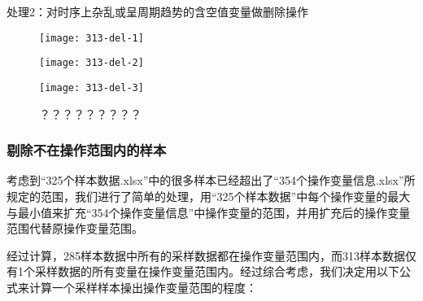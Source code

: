 \documentclass[bwprint]{gmcmthesis}
\begin{document}
处理2：对时序上杂乱或呈周期趋势的含空值变量做删除操作


\begin{figure}[htb]
    \centering
    \begin{minipage}[c]{0.48\textwidth}
        \centering
        \texttt{[image: 313-del-1]}
    \end{minipage}
    \begin{minipage}[c]{0.48\textwidth}
        \centering
        \texttt{[image: 313-del-2]}
    \end{minipage}
     \begin{minipage}[c]{0.48\textwidth}
        \centering
        \texttt{[image: 313-del-3]}
    \end{minipage}
    \caption{？？？？？？？？？}
\end{figure}








\FloatBarrier
\subsubsection{剔除不在操作范围内的样本}

考虑到“325个样本数据.xlsx”中的很多样本已经超出了“354个操作变量信息.xlsx”所规定的范围，我们进行了简单的处理，用“325个样本数据”中每个操作变量的最大与最小值来扩充“354个操作变量信息”中操作变量的范围，并用扩充后的操作变量范围代替原操作变量范围。

经过计算，285样本数据中所有的采样数据都在操作变量范围内，而313样本数据仅有1个采样数据的所有变量在操作变量范围内。经过综合考虑，我们决定用以下公式来计算一个采样样本操出操作变量范围的程度：
\end{document}
